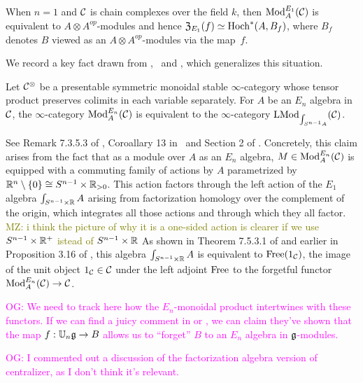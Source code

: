 \documentclass[11pt]{amsart}
\numberwithin{equation}{section}
\def\owen{\textcolor{magenta}{OG: }\textcolor{magenta}}
\def\mahmoud{\textcolor{olive}{MZ: }\textcolor{olive}}
\begin{document}
When $n=1$ and $\mathcal C$ is chain complexes over the field $k$, then ${\rm Mod}^{E_1}_A(\mathcal C)$ is equivalent to $A\otimes A^{op}$-modules and hence ${\frak Z}_{E_1}(f) \simeq {\rm Hoch}^*(A,B_f)$,
where $B_f$ denotes $B$ viewed as an $A\otimes A^{op}$-modules via the map~$f$.

We record a key fact drawn from \cite{LurieHA},~\cite{FrancisHH}  and \cite{GG-Notes}, which generalizes this situation.

\begin{prp}
\label{P:ModentoModSn}
Let $\mathcal C^\otimes$ be a presentable symmetric monoidal stable $\infty$-category whose tensor product preserves colimits in each variable separately.
For $A$ be an $E_n$ algebra in $\mathcal C$,
the $\infty$-category ${\rm Mod}^{E_n}_A(\mathcal C)$ is equivalent to the $\infty$-category ${\rm LMod}_{\int_{S^{n-1} A}}(\mathcal C)$.
\end{prp}

See Remark 7.3.5.3 of \cite{LurieHA}, Coroallary 13 in~\cite{GG-Notes} and Section 2 of \cite{FrancisHH}.
Concretely, this claim arises from the fact that as a module over $A$ as an $E_n$ algebra, 
$M \in {\rm Mod}^{E_n}_A(\mathcal C)$ is equipped with a commuting family of actions by $A$ parametrized by $\mathbb R^n \setminus \{0\}\cong S^{n-1} \times \mathbb R_{>0}$.
This action factors through the left action of the $E_1$ algebra $\int_{S^{n-1} \times \mathbb R} A$ arising from factorization homology over the complement of the origin,
which integrates all those actions and through which they all factor. \mahmoud{i think the picture of why it is a one-sided action is clearer if we use $S^{n-1} \times \mathbb R^+$ istead of $S^{n-1} \times \mathbb R$}
As shown in Theorem 7.5.3.1 of \cite{LurieHA} and earlier in Proposition 3.16 of \cite{FrancisHH}, 
this algebra $\int_{S^{n-1} \times \mathbb R} A$ is equivalent to ${\rm Free}(1_\mathcal C)$, 
the image of the unit object $1_\mathcal C \in \mathcal C$ under the left adjoint ${\rm Free}$ to the forgetful functor ${\rm Mod}^{E_n}_A(\mathcal C) \to \mathcal C$.

\owen{We need to track here how the $E_n$-monoidal product intertwines with these functors.
If we can find a juicy comment in \cite{LurieHA} or \cite{FrancisHH}, 
we can claim they've shown that the map $f: \mathbb U_n \mathfrak g \to B$ allows us to ``forget'' $B$ to an $E_n$ algebra in $\mathfrak g$-modules.}

\owen{I commented out a discussion of the factorization algebra version of centralizer, as I don't think it's relevant.}
\end{document}
